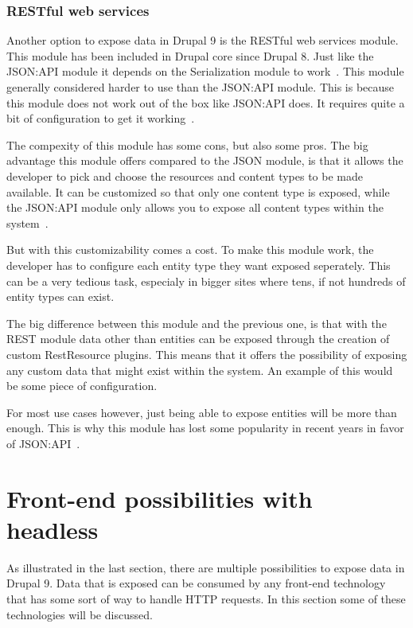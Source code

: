 \subsubsection{RESTful web services}

Another option to expose data in Drupal 9 is the RESTful web services module. This module has been included in Drupal core since Drupal 8. Just like the JSON:API module it depends on the Serialization module to work~\autocite{Drupal2018}.
This module generally considered harder to use than the JSON:API module. This is because this module does not work out of the box like JSON:API does. It requires quite a bit of configuration to get it working~\autocite{Drupal2018}.

The compexity of this module has some cons, but also some pros. The big advantage this module offers compared to the JSON module, is that it allows the developer to pick and choose the resources and content types to be made available. It can be customized so that only one content type is exposed, while the JSON:API module only allows you to expose all content types within the system~\autocite{So2018}. 

But with this customizability comes a cost. To make this module work, the developer has to configure each entity type they want exposed seperately. This can be a very tedious task, especialy in bigger sites where tens, if not hundreds of entity types can exist.

The big difference between this module and the previous one, is that with the REST module data other than entities can be exposed through the creation of custom RestResource plugins. This means that it offers the possibility of exposing any custom data that might exist within the system. An example of this would be some piece of configuration.

For most use cases however, just being able to expose entities will be more than enough. This is why this module has lost some popularity in recent years in favor of JSON:API~\autocite{So2018}.

\section{Front-end possibilities with headless}

As illustrated in the last section, there are multiple possibilities to expose data in Drupal 9. Data that is exposed can be consumed by any front-end technology that has some sort of way to handle HTTP requests. In this section some of these technologies will be discussed.

